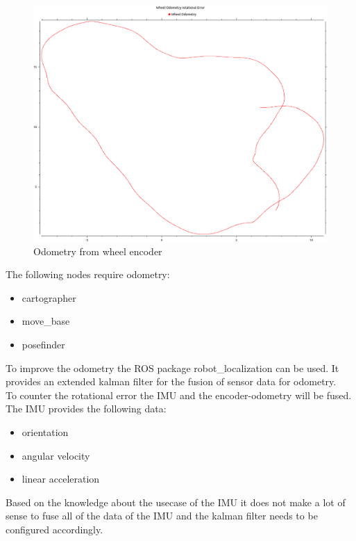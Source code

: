\begin{figure}
	\includegraphics[width=\textwidth]{Pictures/rot error}
	\caption{Odometry from wheel encoder}
	\label{wheel odom}

\end{figure}


The following nodes require odometry:
\begin{itemize}
	\item cartographer
	\item move\_base
	\item posefinder
\end{itemize}

To improve the odometry the ROS package robot\_localization can be used. It provides an extended kalman filter for the fusion of sensor data for odometry.\\

To counter the rotational error the IMU and the encoder-odometry will be fused.\\

The IMU provides the following data:
\begin{itemize}
	\item orientation
	\item angular velocity
	\item linear acceleration
\end{itemize}

Based on the knowledge about the usecase of the IMU it does not make a lot of sense to fuse all of the data of the IMU and the kalman filter needs to be configured accordingly.\\


